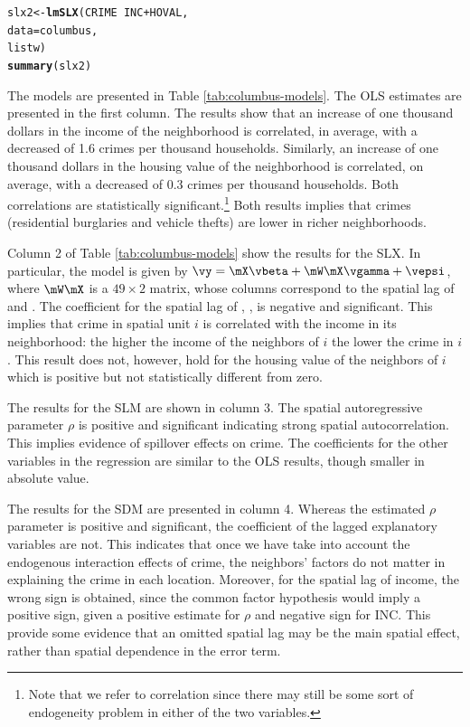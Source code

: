\documentclass[english,12pt]{book}\usepackage[]{graphicx}\usepackage[]{xcolor}
\makeatletter
\newcommand{\hlopt}[1]{\textcolor[rgb]{0,0,0}{#1}}%
\newcommand{\hlstd}[1]{\textcolor[rgb]{0.345,0.345,0.345}{#1}}%
\newcommand{\hlkwb}[1]{\textcolor[rgb]{0.69,0.353,0.396}{#1}}%
\newcommand{\hlkwc}[1]{\textcolor[rgb]{0.333,0.667,0.333}{#1}}%
\newcommand{\hlkwd}[1]{\textcolor[rgb]{0.737,0.353,0.396}{\textbf{#1}}}%
\newenvironment{kframe}{%
 \def\at@end@of@kframe{}%
 \ifinner\ifhmode%
  \def\at@end@of@kframe{\end{minipage}}%
  \begin{minipage}{\columnwidth}%
 \fi\fi%
 \def\FrameCommand##1{\hskip\@totalleftmargin \hskip-\fboxsep
 \colorbox{shadecolor}{##1}\hskip-\fboxsep
     \hskip-\linewidth \hskip-\@totalleftmargin \hskip\columnwidth}%
 \MakeFramed {\advance\hsize-\width
   \@totalleftmargin\z@ \linewidth\hsize
   \@setminipage}}%
 {\par\unskip\endMakeFramed%
 \at@end@of@kframe}
\newenvironment{knitrout}{}{} %
\makeatother
\begin{document}
\begin{knitrout}
\color{fgcolor}\begin{kframe}
\begin{alltt}
\hlstd{slx2} \hlkwb{<-} \hlkwd{lmSLX}\hlstd{(CRIME} \hlopt{~} \hlstd{INC} \hlopt{+} \hlstd{HOVAL,}
              \hlkwc{data} \hlstd{= columbus,}
              \hlstd{listw)}
\hlkwd{summary}\hlstd{(slx2)}
\end{alltt}
\end{kframe}
\end{knitrout}



The models are presented in Table \ref{tab:columbus-models}. The OLS estimates are presented in the first column. The results show that an increase of one  thousand dollars in the income of the neighborhood is correlated, in average, with a decreased of 1.6 crimes per thousand households. Similarly, an increase of one thousand dollars in the housing value of the neighborhood is correlated, on average, with a decreased of 0.3 crimes per thousand households. Both correlations are statistically significant.\footnote{Note that we refer to correlation since there may still be some sort of endogeneity problem in either of the two variables.} Both results implies that crimes (residential burglaries and vehicle thefts) are lower in richer neighborhoods. 

Column 2 of Table \ref{tab:columbus-models} show the results for the SLX. In particular, the model is given by $\vy = \mX\vbeta + \mW\mX\vgamma + \vepsi$, where $\mW\mX$ is a $49\times 2$ matrix, whose columns correspond to the spatial lag of  and . The coefficient for the spatial lag of , , is negative and significant. This implies that crime in spatial unit $i$ is correlated with the income in its neighborhood: the higher the income of the neighbors of $i$ the lower the crime in $i$. This result does not, however, hold for the housing value of the neighbors of $i$ which is positive but not statistically different from zero. 

The results for the SLM are shown in column 3. The spatial autoregressive parameter $\rho$ is positive and significant indicating strong spatial autocorrelation. This implies evidence of spillover effects on crime. The coefficients for the other variables in the regression are similar to the OLS results, though smaller in absolute value.

The results for the SDM are presented in column 4. Whereas the estimated $\rho$ parameter is positive and significant, the coefficient of the lagged explanatory variables are not. This indicates that once we have take into account the endogenous interaction effects of crime, the neighbors' factors do not matter in explaining the crime in each location. Moreover, for the spatial lag of income, the wrong sign is obtained, since the common factor hypothesis would imply a positive sign, given a positive estimate for $\rho$ and negative sign for INC. This provide some evidence that an omitted spatial lag may be the main spatial effect, rather than spatial dependence in the error term. 
\end{document}
